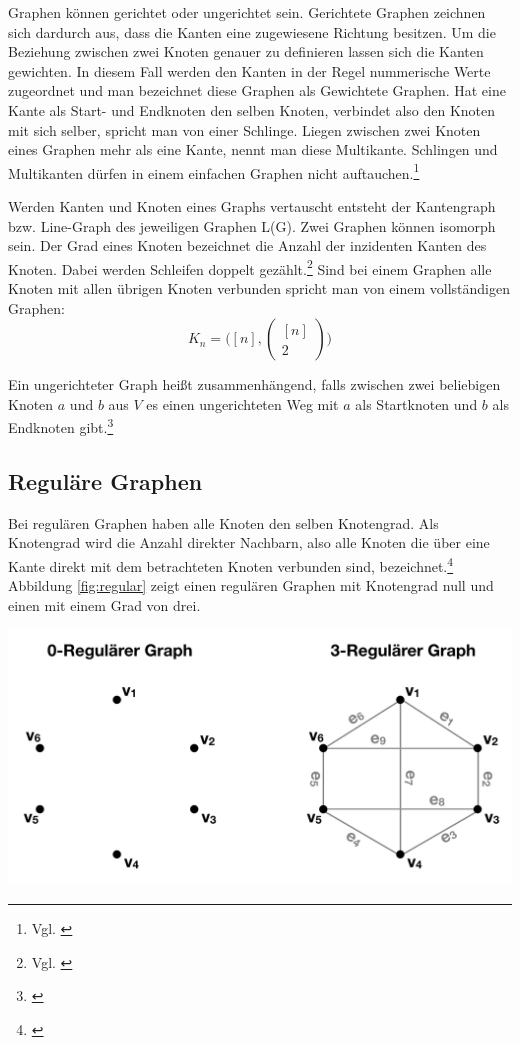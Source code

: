 Graphen können gerichtet oder ungerichtet sein.
Gerichtete Graphen zeichnen sich dardurch aus, dass die Kanten eine zugewiesene Richtung besitzen.
Um die Beziehung zwischen zwei Knoten genauer zu definieren lassen sich die Kanten gewichten.
In diesem Fall werden den Kanten in der Regel nummerische Werte zugeordnet und man bezeichnet diese Graphen als Gewichtete Graphen.
Hat eine Kante als Start- und Endknoten den selben Knoten, verbindet also den Knoten mit sich selber, spricht man von einer Schlinge.
Liegen zwischen zwei Knoten eines Graphen mehr als eine Kante, nennt man diese Multikante.
Schlingen und Multikanten dürfen in einem einfachen Graphen nicht auftauchen.\footnote{Vgl. \cite{felsner01}}

Werden Kanten und Knoten eines Graphs vertauscht entsteht der Kantengraph bzw. Line-Graph des jeweiligen Graphen L(G).
Zwei Graphen können isomorph sein.
Der Grad eines Knoten bezeichnet die Anzahl der inzidenten Kanten des Knoten.
Dabei werden Schleifen doppelt gezählt.\footnote{Vgl. \cite[Seite 13]{rahm2017}}
Sind bei einem Graphen alle Knoten mit allen übrigen Knoten verbunden spricht man von einem vollständigen Graphen:
	\[K_{n}=\big([n],\begin{pmatrix}
		[n] \\ 2
	\end{pmatrix}\big)\]

Ein ungerichteter Graph heißt zusammenhängend, falls zwischen zwei beliebigen Knoten $a$ und $b$ aus $V$ es einen ungerichteten Weg mit $a$ als Startknoten und $b$ als Endknoten gibt.\footnote{\cite[36-38]{krumke2012graphentheoretische}}

\subsection{Reguläre Graphen}
Bei regulären Graphen haben alle Knoten den selben Knotengrad.
Als Knotengrad wird die Anzahl direkter Nachbarn, also alle Knoten die über eine Kante direkt mit dem betrachteten Knoten verbunden sind, bezeichnet.\footnote{\cite{felsner2012geometric}}
Abbildung \ref{fig:regular} zeigt einen regulären Graphen mit Knotengrad null und einen mit einem Grad von drei.
\begin{center}
	\includegraphics[scale = 0.4]{./images/Regulaerer_graph.png}
	\label{fig:regular}
\end{center}
